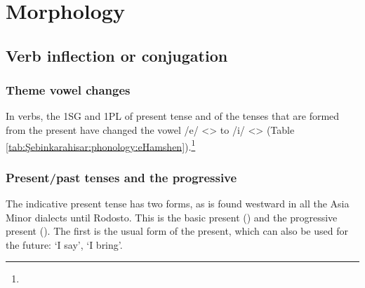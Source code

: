 \section{Morphology}
\subsection{Verb inflection or conjugation}
\subsubsection{Theme vowel changes}
In verbs, the 1SG and 1PL of present tense and of the tenses that are formed from the present have changed the vowel /e/ <> to /i/ <> (Table \ref{tab:Şebinkarahisar:phonology:eHamshen}).\footnote{ }


\begin{table}[H]
	\centering 
	\caption{Change from theme vowel /e/ <> to /i/ <> in the Şebinkarahisar dialect}
	\label{tab:Şebinkarahisar:phonology:eHamshen}
\end{table}

\subsubsection{Present/past tenses and the progressive}

The indicative present tense has two forms, as is found westward in all the Asia Minor dialects until Rodosto. This is the basic present () and the progressive present (). The first is the usual form of the present, which can also be used for the future: `I say', `I bring'.


